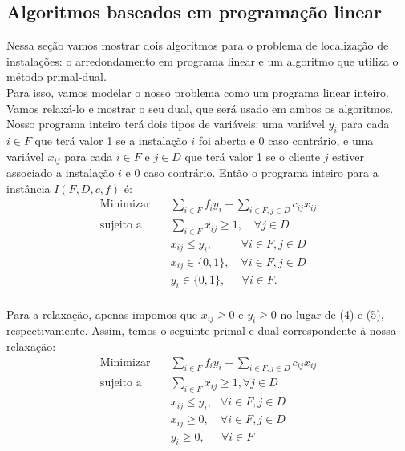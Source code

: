 \documentclass[12pt]{article}
\begin{document}
\subsection{Algoritmos baseados em programação linear}
Nessa seção vamos mostrar dois algoritmos para o problema de localização de instalações: o arredondamento em programa linear e um algoritmo que utiliza o método primal-dual. \\
Para isso, vamos modelar o nosso problema como um programa linear inteiro. Vamos relaxá-lo e mostrar o seu dual, que será usado em ambos os algoritmos. \\
Nosso programa inteiro terá dois tipos de variáveis: uma variável $y_i$ para cada $i \in F$ que terá valor 1 se a instalação $i$ foi aberta e 0 caso contrário, e uma variável $x_{ij}$ para cada $i \in F$ e $j \in D$ que terá valor 1 se o cliente $j$ estiver associado a instalação $i$ e 0 caso contrário. Então o programa inteiro para a instância $I(F,D,c,f)$ é:
\begin{align}
 \text{Minimizar} \quad & \sum_{i \in F}f_iy_i + \sum_{i\in F,j\in D}c_{ij}x_{ij} \\
 \text{sujeito a} \quad & \sum_{i\in F} x_{ij}\geq1, \quad \forall j \in D \\
 &x_{ij} \leq y_i,\quad \quad \; \; \forall i\in F,j\in D\\
 &x_{ij} \in \{0,1\} ,\quad \forall i\in F,j\in D\\
 &y_i \in \{0,1\}, \quad \; \,\forall i\in F.
\end{align}
\\
Para a relaxação, apenas impomos que $x_{ij} \geq 0$ e $y_i \geq 0$ no lugar de (4) e (5), respectivamente. Assim, temos o seguinte primal e dual correspondente à nossa relaxação:
    \begin{align}
        \text{Minimizar} \quad & \sum_{i \in F}f_iy_i + \sum_{i\in F,j\in D}c_{ij}x_{ij} \tag{P1} \label{P1}\\
        \text{sujeito a} \quad & \sum_{i\in F} x_{ij}\geq1,  \forall j \in D \tag{P2} \label{P2}\\
        &x_{ij} \leq y_i, \, \; \; \forall i\in F,j\in D \tag{P3} \label{P3}\\
        &x_{ij} \geq 0,\quad \forall i\in F,j\in D\tag{P4}\label{P4}\\
        &y_i \geq 0, \quad \; \,\forall i\in F \tag{P5} \label{P5}
       \end{align}
\end{document}
